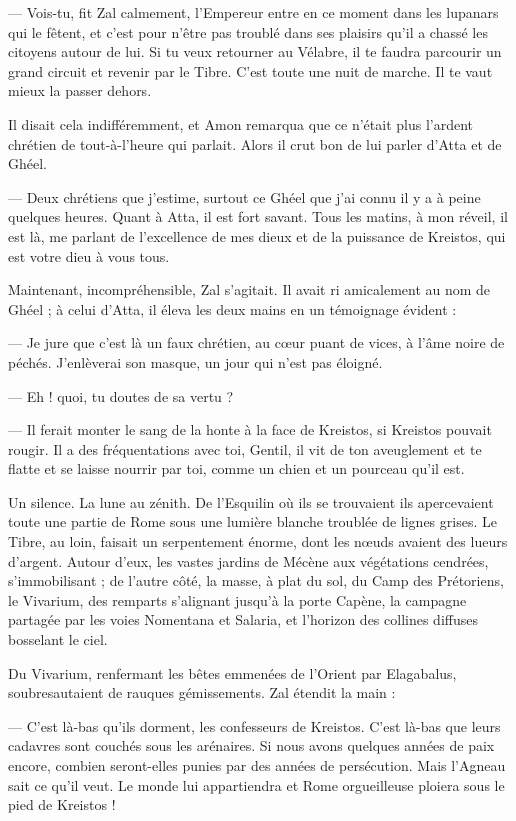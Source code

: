 \documentclass[a4paper, 11pt, oneside, polutonikogreek, french]{article}
\begin{document}
--- Vois-tu, fit Zal calmement, l'Empereur entre en ce moment dans les lupanars qui le fêtent, et c'est pour n'être pas troublé dans ses plaisirs qu'il a chassé les citoyens autour de lui. Si tu veux retourner au Vélabre, il te faudra parcourir un grand circuit et revenir par le Tibre. C'est toute une nuit de marche. Il te vaut mieux la passer dehors.

Il disait cela indifféremment, et Amon remarqua que ce n'était plus l'ardent chrétien de tout-à-l'heure qui parlait. Alors il crut bon de lui parler d'Atta et de Ghéel.

--- Deux chrétiens que j'estime, surtout ce Ghéel que j'ai connu il y a à peine quelques heures. Quant à Atta, il est fort savant. Tous les matins, à mon réveil, il est là, me parlant de l'excellence de mes dieux et de la puissance de Kreistos, qui est votre dieu à vous tous.

Maintenant, incompréhensible, Zal s'agitait. Il avait ri amicalement au nom de Ghéel ; à celui d'Atta, il éleva les deux mains en un témoignage évident :

--- Je jure que c'est là un faux chrétien, au cœur puant de vices, à l'âme noire de péchés. J'enlèverai son masque, un jour qui n'est pas éloigné.

--- Eh ! quoi, tu doutes de sa vertu ?

--- Il ferait monter le sang de la honte à la face de Kreistos, si Kreistos pouvait rougir. Il a des fréquentations avec toi, Gentil, il vit de ton aveuglement et te flatte et se laisse nourrir par toi, comme un chien et un pourceau qu'il est.

Un silence. La lune au zénith. De l'Esquilin où ils se trouvaient ils apercevaient toute une partie de Rome sous une lumière blanche troublée de lignes grises. Le Tibre, au loin, faisait un serpentement énorme, dont les nœuds avaient des lueurs d'argent. Autour d'eux, les vastes jardins de Mécène aux végétations cendrées, s'immobilisant ; de l'autre côté, la masse, à plat du sol, du Camp des Prétoriens, le Vivarium, des remparts s'alignant jusqu'à la porte Capène, la campagne partagée par les voies Nomentana et Salaria, et l'horizon des collines diffuses bosselant le ciel.

Du Vivarium, renfermant les bêtes emmenées de l'Orient par Elagabalus, soubresautaient de rauques gémissements. Zal étendit la main :

--- C'est là-bas qu'ils dorment, les confesseurs de Kreistos. C'est là-bas que leurs cadavres sont couchés sous les arénaires. Si nous avons quelques années de paix encore, combien seront-elles punies par des années de persécution. Mais l'Agneau sait ce qu'il veut. Le monde lui appartiendra et Rome orgueilleuse ploiera sous le pied de Kreistos !
\end{document}
